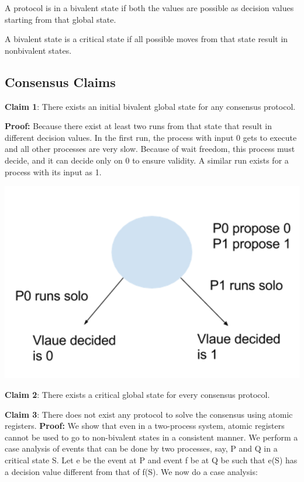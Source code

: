 \documentclass[twoside]{article}
\begin{document}
A protocol is in a bivalent state if both the values are possible as decision values starting from that global state. 

A bivalent state is a critical state if all possible moves from that state result in nonbivalent states.

\subsection{Consensus Claims}

\textbf{Claim 1}: There exists an initial bivalent global state for any consensus protocol.

\textbf{Proof:}
Because there exist at least two runs from that state that result in diﬀerent decision values. In the ﬁrst run, the process with input 0 gets to execute and all other processes are very slow. Because of wait freedom, this process must decide, and it can decide only on 0 to ensure validity. A similar run exists for a process with its input as 1.

\includegraphics{proof1.png}

\textbf{Claim 2}: There exists a critical global state for every consensus protocol.

\textbf{Claim 3}: There does not exist any protocol to solve the consensus using atomic registers.
\textbf{Proof:} We show that even in a two-process system, atomic registers cannot be used to go to non-bivalent states in a consistent manner. We perform a case analysis of events that can be done by two processes, say, P and Q in a critical state S. Let e be the event at P and event f be at Q be such that e(S) has a decision value diﬀerent from that of f(S). 
We now do a case analysis:
\end{document}

